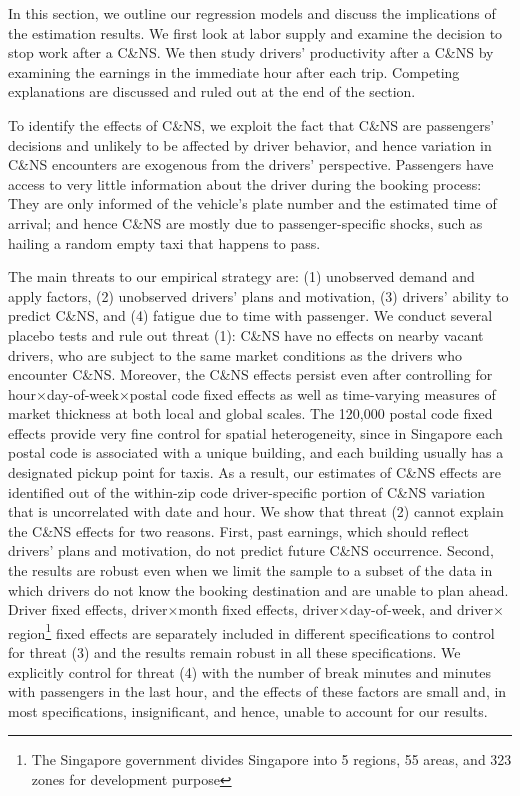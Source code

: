 \documentclass[reviewmode,AEJ]{AEA}
\begin{document}
In this section, we outline our regression models and discuss the implications of the estimation results.
We first look at labor supply and examine the decision to stop work after a C\&NS.
We then study drivers' productivity after a C\&NS by examining the earnings in the immediate hour after each trip. 
Competing explanations are discussed and ruled out at the end of the section.


To identify the effects of C\&NS, we exploit the fact that C\&NS are passengers' decisions and unlikely to be
affected by driver behavior, and hence variation in C\&NS encounters are exogenous from the drivers' perspective.
Passengers have access to very little information about the driver during the booking process: They are only informed of the vehicle's plate number and the estimated time of arrival; and hence C\&NS are mostly due to passenger-specific shocks, such as hailing a random empty taxi that happens to pass.

The main threats to our empirical strategy are: (1) unobserved demand and apply factors, (2) unobserved drivers' plans and motivation, (3) drivers' ability to predict C\&NS, and (4) fatigue due to time with passenger. We conduct several placebo tests and rule out threat (1): C\&NS have no effects on nearby vacant drivers, who are subject to the same market conditions as the drivers who encounter C\&NS. Moreover, the C\&NS effects persist even after controlling for hour\(\times\)day-of-week\(\times\)postal code fixed effects as well as time-varying measures of market thickness at both local and global scales.
The 120,000 postal code fixed effects provide very fine control for spatial 
heterogeneity, since in Singapore each postal code is associated with a unique building, and each building
usually has a designated pickup point for taxis. As a result, our estimates of C\&NS effects are identified 
out of the within-zip code driver-specific portion of C\&NS variation that is uncorrelated with date and hour. 
We show that threat (2) cannot explain the C\&NS effects for two reasons. First, past earnings, which should reflect drivers' plans and motivation, do not predict future C\&NS occurrence. Second, the results are robust even when we limit the sample to a subset of the data in which drivers do not know the booking destination and are unable to plan ahead. Driver fixed effects, driver\(\times\)month fixed effects, driver\(\times\)day-of-week, and driver\(\times\)region\footnote {The Singapore government divides Singapore into 5 regions, 55 areas, and 323 zones for development purpose} fixed effects are separately included in different specifications to control for threat (3) and the results remain robust in all these specifications. We explicitly control for threat (4) with the number of break minutes and minutes with passengers in the last hour, and the effects of these factors are small and, in most specifications, insignificant, and hence, unable to account for our results.
\end{document}
